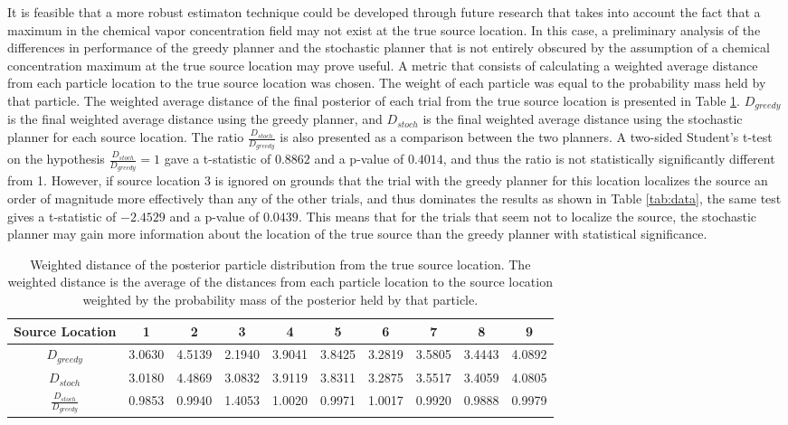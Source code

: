 \documentclass[submit, 12pt]{aiaa-pretty-modified}
\begin{document}
It is feasible that a more robust estimaton technique could be developed through
future research that takes into account the fact that a maximum in the
chemical vapor concentration field may not exist at the true source
location.  In this case, a preliminary analysis of the
differences in performance of the greedy planner and the
stochastic planner that is not entirely obscured by the assumption of a chemical
concentration maximum at the true source location may prove useful.  A
metric that consists of calculating a
weighted average distance from each particle location to the true
source location was chosen.  The weight of each particle was equal to the
probability mass held by that particle.  The weighted average distance
of the final posterior of each trial from the true source location is
presented in Table \ref{tab:weighted-distance}.  $D_{greedy}$ is the final
weighted average distance using the greedy planner, and
$D_{stoch}$ is the final weighted average distance using the
stochastic planner for each source location.  The ratio
$\frac{D_{stoch}}{D_{greedy}}$ is also presented as a comparison
between the two planners.  A two-sided Student's t-test on the
hypothesis $\frac{D_{stoch}}{D_{greedy}} = 1$ gave a t-statistic of
$0.8862$ and a p-value of $0.4014$, and thus the ratio is not
statistically significantly different from 1.  However, if source
location 3 is ignored on grounds that the trial with the greedy
planner for this location localizes the source an order of magnitude
more effectively than any of the other trials, and thus dominates the results as shown in
Table \ref{tab:data}, the same test
gives a t-statistic of $-2.4529$ and a p-value
of $0.0439$.  This means that for the trials that seem not to
localize the source, the stochastic planner may gain more information
about the location of the true source than the greedy planner with
statistical significance.

\begin{table}[htb]
\begin{center}
\begin{tabular}{|c||c||c||c||c||c||c||c||c||c|}
\hline
 Source Location & 1 & 2 & 3 & 4 & 5 & 6 & 7 & 8 & 9 \\
\hline \hline
$D_{greedy}$ & 3.0630 & 4.5139 & 2.1940 & 3.9041 & 3.8425 & 3.2819 & 3.5805 & 3.4443 & 4.0892 \\
\hline
$D_{stoch}$ & 3.0180 & 4.4869 & 3.0832 & 3.9119 & 3.8311 & 3.2875 & 3.5517 & 3.4059 & 4.0805 \\
\hline
$\frac{D_{stoch}}{D_{greedy}}$ & 0.9853 & 0.9940 & 1.4053 & 1.0020 & 0.9971 & 1.0017 & 0.9920 & 0.9888 & 0.9979 \\
\hline
\end{tabular}
\caption[Probabilistically weighted distance from the posterior estimate to the
source location]{Weighted distance of the posterior particle distribution from the true
  source location. The weighted distance is the average of the distances from
  each particle location to the source location weighted by the probability
  mass of the posterior held by that particle.}
\label{tab:weighted-distance}
\end{center}
\end{table}
\end{document}
